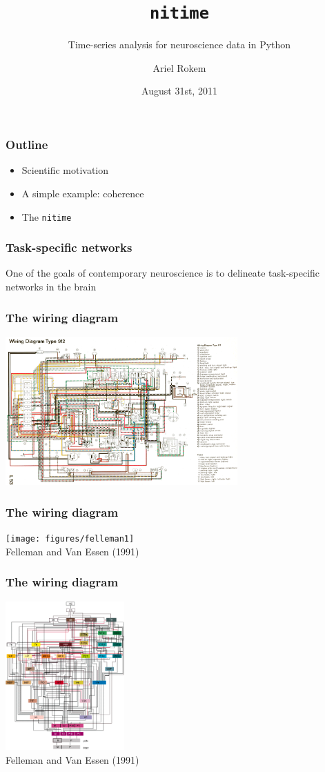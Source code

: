 \documentclass{beamer}
\title[nitime]{\tt{nitime}}
\subtitle
{{Time-series analysis for neuroscience data in Python}}
\author[Ariel Rokem] %
{Ariel Rokem}
\date{August 31st, 2011}
\institute[Stanford University]
{Stanford University}
\begin{document}
\begin{frame}
  \titlepage
\end{frame}

\begin{frame}
\frametitle{Outline}
\begin{itemize}
\pause
\item
Scientific motivation
\pause
\item 
A simple example: coherence
\pause
\item
The \tt{nitime} 
\end{itemize}
\end{frame}

\begin{frame}
\frametitle{Task-specific networks}
  One of the goals of contemporary neuroscience is to delineate task-specific
  networks in the brain
\end{frame}

\begin{frame}
\frametitle{The wiring diagram}
\includegraphics[height=5.7cm]{figures/wiring}
\end{frame}

\begin{frame}
\frametitle{The wiring diagram}
\texttt{[image: figures/felleman1]}
\\
\hfill
Felleman and Van Essen (1991)
\end{frame}

\begin{frame}
\frametitle{The wiring diagram}
\includegraphics[height=5.7cm]{figures/felleman2}
\\
\hfill
Felleman and Van Essen (1991)
\end{frame}
\end{document}
